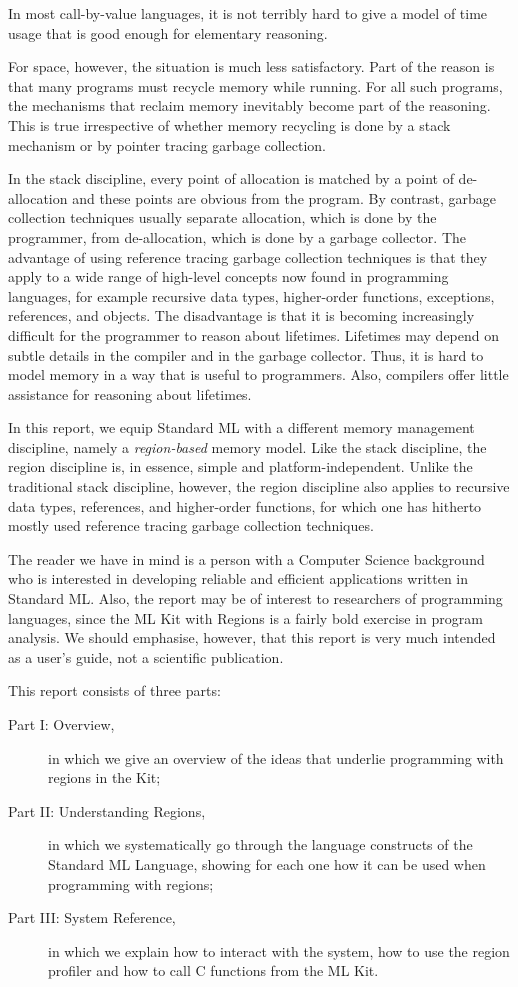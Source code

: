 \documentclass[12pt]{book}
\begin{document}
In most call-by-value languages, it is not terribly hard to give a
model of time usage that is good enough for elementary reasoning. 

For space, however, the situation is much less satisfactory. Part of
the reason is that many programs must recycle memory while running.
For all such programs, the mechanisms that reclaim memory inevitably
become part of the reasoning.  This is true irrespective of whether memory
recycling is done by a stack mechanism or by pointer tracing garbage
collection.

In the stack discipline, every point of allocation is matched by a
point of de-allocation and these points are obvious from the
program. By contrast, garbage collection techniques usually separate
allocation, which is done by the programmer, from de-allocation, which
is done by a garbage collector.  The advantage of using reference
tracing garbage collection techniques is that they apply to a wide
range of high-level concepts now found in programming languages, for
example recursive data types, higher-order functions, exceptions,
references, and objects. The disadvantage is that it is becoming
increasingly difficult for the programmer to reason about
lifetimes. Lifetimes may depend on subtle details in the compiler and
in the garbage collector. Thus, it is hard to model memory in a way
that is useful to programmers. Also, compilers offer little
assistance for reasoning about lifetimes.

In this report, we equip Standard ML with a different memory management
discipline,  namely a {\em region-based} memory model.
Like the stack discipline, the region discipline is, in essence, simple and
platform-independent. Unlike the traditional stack discipline,
however, the region discipline also applies to recursive data types,
references, and higher-order functions, for which one has hitherto
mostly used reference tracing garbage collection techniques.

The reader we have in mind is a person with a Computer Science
background who is interested in developing reliable and efficient
applications written in Standard ML. Also, the report may be of
interest to researchers of programming languages, since the ML Kit
with Regions is a fairly bold exercise in program analysis. We should
emphasise, however, that this report is very much intended as a user's
guide, not a scientific publication.

This report consists of three parts:
\begin{description}
\item[Part I: Overview,] in which we give an overview of the ideas that underlie programming with
regions in the Kit;
\item[Part II: Understanding Regions,] in which we systematically
go through the language constructs of the Standard ML Language,
showing for each one how it can be used when programming with regions;
\item[Part III: System Reference,] in which we explain how to interact with
the system, how to use the region profiler and how to call C functions from the ML Kit.
\end{description}
\end{document}
